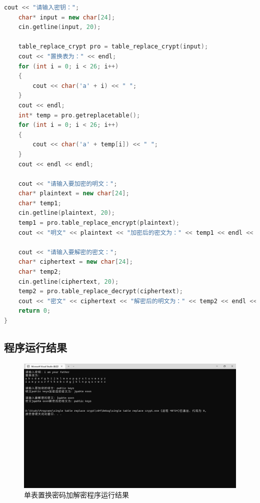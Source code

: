 \begin{lstlisting}[language=c++]
	cout << "请输入密钥：";
	char* input = new char[24];
	cin.getline(input, 20);
	
	table_replace_crypt pro = table_replace_crypt(input);
	cout << "置换表为：" << endl;
	for (int i = 0; i < 26; i++)
	{
		cout << char('a' + i) << " ";
	}
	cout << endl;
	int* temp = pro.getreplacetable();
	for (int i = 0; i < 26; i++)
	{
		cout << char('a' + temp[i]) << " ";
	}
	cout << endl << endl;
	
	cout << "请输入要加密的明文：";
	char* plaintext = new char[24];
	char* temp1;
	cin.getline(plaintext, 20);
	temp1 = pro.table_replace_encrypt(plaintext);
	cout << "明文" << plaintext << "加密后的密文为：" << temp1 << endl << endl;
	
	cout << "请输入要解密的密文：";
	char* ciphertext = new char[24];
	char* temp2;
	cin.getline(ciphertext, 20);
	temp2 = pro.table_replace_decrypt(ciphertext);
	cout << "密文" << ciphertext << "解密后的明文为：" << temp2 << endl << endl;
	return 0;
}
\end{lstlisting}


\subsection{程序运行结果}
\begin{figure}[thbp!]
	\centering
	\includegraphics[width=16cm]{figure/003.png}
	\caption{单表置换密码加解密程序运行结果}
	\label{fig:单表置换密码加解密程序运行结果}
\end{figure}

%	
%	
%	

